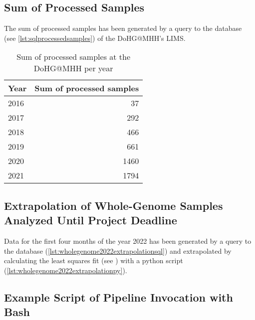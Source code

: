 \subsection{Sum of Processed Samples}

The sum of processed samples has been generated by a query to the database (see \autoref{lst:sqlprocessedsamples}) of the \ac{DoHG@MHH}'s \ac{LIMS}.

\begin{table}[H]
\centering
\caption{Sum of processed samples at the \acs{DoHG@MHH} per year}
\label{tab:sum_of_samples}
\begin{tabular}{lr}
\toprule
Year & Sum of processed samples \\
\midrule
2016 & 37 \\
2017 & 292 \\
2018 & 466 \\
2019 & 661 \\
2020 & 1460 \\
2021 & 1794 \\
\bottomrule
\end{tabular}
\end{table}



\clearpage
\subsection{Extrapolation of Whole-Genome Samples Analyzed Until Project Deadline}\label{appendix:extrapolation}
Data for the first four months of the year 2022 has been generated by a query to the database (\autoref{lst:wholegenome2022extrapolationsql}) and extrapolated by calculating the least squares fit (see \autocite{NumPyDevelopers2022}) with a python script (\autoref{lst:wholegenome2022extrapolationpy}).






\clearpage
\subsection{Example Script of Pipeline Invocation with Bash}\label{appendix:bashscript}


